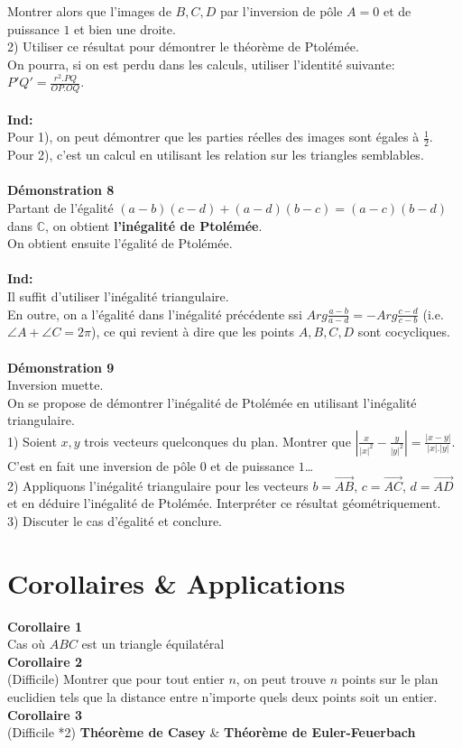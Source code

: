 \documentclass{article}
\begin{document}
Montrer alors que l'images de $B,C,D$ par l'inversion de p\^ole $A=0$ et de puissance $1$ et bien une droite.\\
2) Utiliser ce r\'esultat pour d\'emontrer le th\'eor\`eme de Ptol\'em\'ee.\\
On pourra, si on est perdu dans les calculs, utiliser l'identit\'e suivante: $P'Q'=\frac{r^2.PQ}{OP.OQ}$.\\
\\
\textbf{Ind:}\\
Pour 1), on peut d\'emontrer que les parties r\'eelles des images sont \'egales \`a $\frac{1}{2}$.\\
Pour 2), c'est un calcul en utilisant les relation sur les triangles semblables.\\
\\
\textbf{D\'emonstration 8}\\
Partant de l'\'egalit\'e $(a-b)(c-d)+(a-d)(b-c)=(a-c)(b-d)$ dans $\mathbb{C}$, on obtient \textbf{l'in\'egalit\'e de Ptol\'em\'ee}.\\
On obtient ensuite l'\'egalit\'e de Ptol\'em\'ee.\\
\\
\textbf{Ind:}\\
Il suffit d'utiliser l'in\'egalit\'e triangulaire.\\
En outre, on a l'\'egalit\'e dans l'in\'egalit\'e pr\'ec\'edente ssi $Arg\frac{a-b}{a-d}=-Arg\frac{c-d}{c-b}$ (i.e. $\angle A+\angle C=2\pi$), ce qui revient \`a dire que les points $A,B,C,D$ sont cocycliques.\\
\\
\textbf{D\'emonstration 9}\\
Inversion muette.\\
On se propose de d\'emontrer l'in\'egalit\'e de Ptol\'em\'ee en utilisant l'in\'egalit\'e triangulaire.\\
1) Soient $x,y$ trois vecteurs quelconques du plan. Montrer que $|\frac{x}{|x|^2}-\frac{y}{|y|^2}|=\frac{|x-y|}{|x|.|y|}$.\\
C'est en fait une inversion de p\^ole $0$ et de puissance $1$\dots\\
2) Appliquons l'in\'egalit\'e triangulaire pour les vecteurs $b=\overrightarrow{AB}$, $c=\overrightarrow{AC}$, $d=\overrightarrow{AD}$ et en d\'eduire l'in\'egalit\'e de Ptol\'em\'ee. Interpr\'eter ce r\'esultat g\'eom\'etriquement.\\
3) Discuter le cas d'\'egalit\'e et conclure.
\section{Corollaires \& Applications}
\textbf{Corollaire 1}\\
Cas o\`u $ABC$ est un triangle \'equilat\'eral\\
\textbf{Corollaire 2}\\
(Difficile) Montrer que pour tout entier $n$, on peut trouve $n$ points sur le plan euclidien tels que la distance entre n'importe quels deux points soit un entier.\\
\textbf{Corollaire 3}\\
(Difficile *2) \textbf{Th\'eor\`eme de Casey} \& \textbf{Th\'eor\`eme de Euler-Feuerbach}
\end{document}
